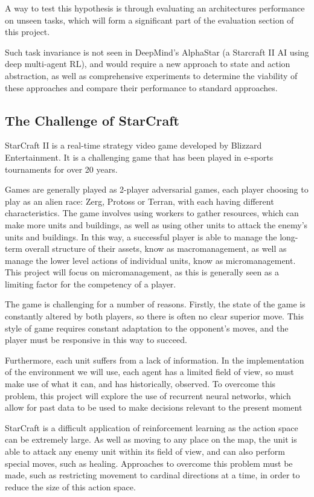 A way to test this hypothesis is through evaluating an architectures performance on unseen tasks, which will form a significant part of the evaluation section of this project.

Such task invariance is not seen in DeepMind's AlphaStar \cite{alphastar} (a Starcraft II AI using deep multi-agent RL), and would require a new approach to state and action abstraction, as well as comprehensive experiments to determine the viability of these approaches and compare their performance to standard approaches.


\subsection{The Challenge of StarCraft}

StarCraft II is a real-time strategy video game developed by Blizzard Entertainment. It is a challenging game that has been played in e-sports tournaments for over 20 years.

Games are generally played as 2-player adversarial games, each player choosing to play as an alien race: Zerg, Protoss or Terran, with each having different characteristics. The game involves using workers to gather resources, which can make more units and buildings, as well as using other units to attack the enemy's units and buildings. In this way, a successful player is able to manage the long-term overall structure of their assets, know as macromanagement, as well as manage the lower level actions of individual units, know as micromanagement. This project will focus on micromanagement, as this is generally seen as a limiting factor for the competency of a player.

The game is challenging for a number of reasons. Firstly, the state of the game is constantly altered by both players, so there is often no clear superior move. This style of game requires constant adaptation to the opponent's moves, and the player must be responsive in this way to succeed. 

Furthermore, each unit suffers from a lack of information. In the implementation of the environment we will use, each agent has a limited field of view, so must make use of what it can, and has historically, observed. To overcome this problem, this project will explore the use of recurrent neural networks, which allow for past data to be used to make decisions relevant to the present moment

StarCraft is a difficult application of reinforcement learning as the action space can be extremely large. As well as moving to any place on the map, the unit is able to attack any enemy unit within its field of view, and can also perform special moves, such as healing. Approaches to overcome this problem must be made, such as restricting movement to cardinal directions at a time, in order to reduce the size of this action space. 

